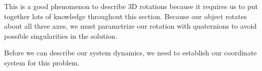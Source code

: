 \documentclass[12pt]{report}
\begin{document}
{This is a good phenomenon to describe 3D rotations because it requires us to put together lots of knowledge throughout this section. Because our object rotates about all three axes, we must parametrize our rotation with \glspl{quaternion} to avoid possible singularities in the solution.

Before we can describe our system dynamics, we need to establish our coordinate system for this problem.

\begin{figure}[ht]
    \centering



\begin{tikzpicture}[x=0.75pt,y=0.75pt,yscale=-1,xscale=1]



\end{tikzpicture}
\end{figure}}
\end{document}
